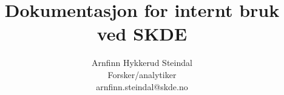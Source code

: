 \usepackage{xcolor}
\usepackage[norsk]{babel}

\usepackage[utf8]{inputenc}
\usepackage{libertine} %
\usepackage[T1]{fontenc}

\usepackage{parskip}

\usepackage{booktabs}


\usepackage{sectsty}
\allsectionsfont{\sffamily\color{skde}}

\usepackage{pdfpages} %




\makeatletter
\newcommand{\globalcolor}[1]{%
  \color{#1}\global\let\default@color\current@color
}
\makeatother

\AtBeginDocument{\globalcolor{text}}

\usepackage{framed,color}

\renewcommand{\textfraction}{0.05}
\renewcommand{\topfraction}{0.8}
\renewcommand{\bottomfraction}{0.8}
\renewcommand{\floatpagefraction}{0.75}

\title{Dokumentasjon for internt bruk ved SKDE} %
\newcommand{\sammendrag}{Dette er en samling dokumentasjon om diverse datatekniske utfordringer og løsninger ved SKDE. Det er hovedsakelig skrevet av Arnfinn, men andre må også gjerne bidra. Man kan bidra \href{https://github.com/SKDE-Analyse/dokumentasjon/}{her} eller på \textit{Analyse/Data/skde-analyse.github.io/dokumentasjon}} %
\newcommand{\notatnummer}{\today} %
\author{%
    Arnfinn Hykkerud Steindal \\
    Forsker/analytiker \\
    arnfinn.steindal@skde.no
}

\newcommand{\hoydestrek}{65pt} %

\usepackage{amsmath}
\usepackage{tikz}
\usepackage{epigraph}

\renewcommand\epigraphflush{flushright}
\renewcommand\epigraphsize{\normalsize}
\setlength{}

